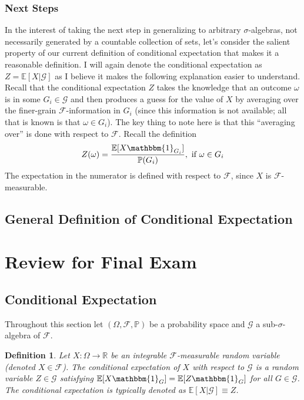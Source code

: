 \documentclass[12pt]{article}
\newcommand{\E}{\mathbb{E}}
\newcommand{\R}{\mathbb{R}}
\newcommand{\Prob}{\mathbb{P}}
\newtheorem{definition}{Definition}
\begin{document}
\subsubsection{Next Steps}
In the interest of taking the next step in generalizing to arbitrary $\sigma$-algebras, not necessarily generated by a countable collection of sets, let's consider the salient property of our current definition of conditional expectation 
that makes it a reasonable definition. I will again denote the conditional expectation as $Z = \E[X|\mathcal{G}]$ as I believe it makes the following explanation easier to understand. Recall that the conditional expectation $Z$ 
takes the knowledge that an outcome $\omega$ is in some $G_i \in \mathcal{G}$ and then produces a guess for the value of $X$ by averaging over the finer-grain $\mathcal{F}$-information in $G_i$ (since this information is not 
available; all that is known is that $\omega \in G_i$). The key thing to note here is that this ``averaging over'' is done with respect to $\mathcal{F}$. Recall the definition 
\[Z(\omega) = \frac{\E[X \mathbbm{1}_{G_i}]}{\Prob(G_i)}, \text{ if } \omega \in G_i\]
The expectation in the numerator is defined with respect to $\mathcal{F}$, since $X$ is $\mathcal{F}$-measurable. 

\subsection{General Definition of Conditional Expectation}

\section{Review for Final Exam}

\subsection{Conditional Expectation}
Throughout this section let $(\Omega, \mathcal{F}, \Prob)$ be a probability space and $\mathcal{G}$ a sub-$\sigma$-algebra of $\mathcal{F}$. 

\begin{definition}
Let $X: \Omega \to \R$ be an integrable $\mathcal{F}$-measurable random variable (denoted $X \in \mathcal{F}$). The conditional expectation of $X$ with respect to $\mathcal{G}$ is a random variable 
$Z \in \mathcal{G}$ satisfying $\E[X \mathbbm{1}_{G}] = \E[Z \mathbbm{1}_{G}]$ for all $G \in \mathcal{G}$. The conditional expectation is typically denoted
as $\E[X|\mathcal{G}] \equiv Z$. 
\end{definition}
\end{document}

